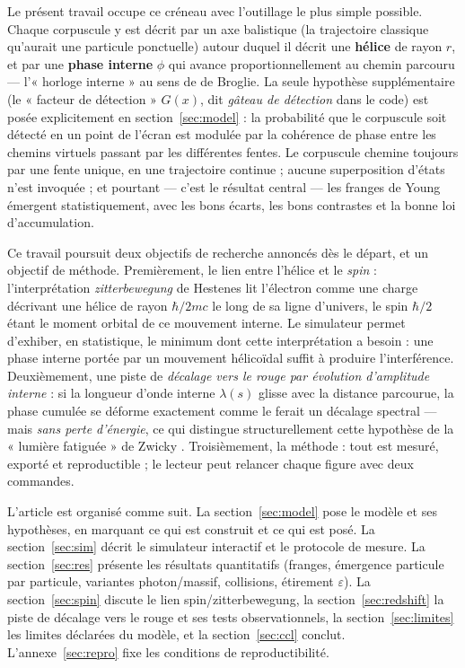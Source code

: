 \documentclass[11pt,a4paper]{article}
\begin{document}
Le présent travail occupe ce créneau avec l'outillage le plus simple possible.
Chaque corpuscule y est décrit par un axe balistique (la trajectoire classique
qu'aurait une particule ponctuelle) autour duquel il décrit une \textbf{hélice} de
rayon $r$, et par une \textbf{phase interne} $\phi$ qui avance proportionnellement
au chemin parcouru --- l'« horloge interne » au sens de de Broglie. La seule
hypothèse supplémentaire (le « facteur de détection » $G(x)$, dit \emph{gâteau de
détection} dans le code) est posée explicitement en section~\ref{sec:model} : la
probabilité que le corpuscule soit détecté en un point de l'écran est modulée par
la cohérence de phase entre les chemins virtuels passant par les différentes fentes.
Le corpuscule chemine toujours par une fente unique, en une trajectoire continue ;
aucune superposition d'états n'est invoquée ; et pourtant --- c'est le résultat
central --- les franges de Young émergent statistiquement, avec les bons écarts,
les bons contrastes et la bonne loi d'accumulation.

Ce travail poursuit deux objectifs de recherche annoncés dès le départ, et un
objectif de méthode. Premièrement, le lien entre l'hélice et le \emph{spin} :
l'interprétation \emph{zitterbewegung} de Hestenes \cite{hestenes1990} lit
l'électron comme une charge décrivant une hélice de rayon $\hbar/2mc$ le long de sa
ligne d'univers, le spin $\hbar/2$ étant le moment orbital de ce mouvement interne.
Le simulateur permet d'exhiber, en statistique, le minimum dont cette interprétation
a besoin : une phase interne portée par un mouvement hélicoïdal suffit à produire
l'interférence. Deuxièmement, une piste de \emph{décalage vers le rouge par évolution
d'amplitude interne} : si la longueur d'onde interne $\lambda(s)$ glisse avec la
distance parcourue, la phase cumulée se déforme exactement comme le ferait un
décalage spectral --- mais \emph{sans perte d'énergie}, ce qui distingue
structurellement cette hypothèse de la « lumière fatiguée » de Zwicky
\cite{zwicky1929}. Troisièmement, la méthode : tout est mesuré, exporté et
reproductible ; le lecteur peut relancer chaque figure avec deux commandes.

L'article est organisé comme suit. La section~\ref{sec:model} pose le modèle et
ses hypothèses, en marquant ce qui est construit et ce qui est posé. La
section~\ref{sec:sim} décrit le simulateur interactif et le protocole de mesure.
La section~\ref{sec:res} présente les résultats quantitatifs (franges, émergence
particule par particule, variantes photon/massif, collisions, étirement
$\varepsilon$). La section~\ref{sec:spin} discute le lien spin/zitterbewegung, la
section~\ref{sec:redshift} la piste de décalage vers le rouge et ses tests
observationnels, la section~\ref{sec:limites} les limites déclarées du modèle, et la
section~\ref{sec:ccl} conclut. L'annexe~\ref{sec:repro} fixe les conditions de
reproductibilité.
\end{document}
